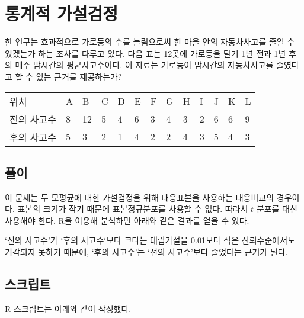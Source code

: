\section{통계적 가설검정}
한 연구는 효과적으로 가로등의 수를 늘림으로써 한 마을 안의 자동차사고를
줄일 수 있겠는가 하는 조사를 다루고 있다. 다음 표는 12곳에 가로등을 달기
1년 전과 1년 후의 매주 밤시간의 평균사고수이다. 이 자료는 가로등이 밤시간의
자동차사고를 줄였다고 할 수 있는 근거를 제공하는가?

\begin{tabularx}{0.9\textwidth}{ l|XXXXXXXXXXXX }
  \noalign{\smallskip}\hline\noalign{\smallskip}
  위치 & A & B & C & D & E & F & G & H & I & J & K & L \\
  전의 사고수 &
    8 & 12 & 5 & 4 & 6 & 3 & 4 & 3 & 2 & 6 & 6 & 9 \\
  후의 사고수 &
    5 &  3 & 2 & 1 & 4 & 2 & 2 & 4 & 3 & 5 & 4 & 3
\end{tabularx}

\subsection{풀이}

이 문제는 두 모평균에 대한 가설검정을 위해 대응표본을 사용하는 대응비교의 경우이다.
표본의 크기가 작기 때문에 표본정규분포를 사용할 수 없다. 따라서 $t$-분포를 대신 사용해야 한다.
R을 이용해 분석하면 아래와 같은 결과를 얻을 수 있다.


`전의 사고수'가 `후의 사고수`보다 크다는 대립가설을 0.01보다 작은 신뢰수준에서도 기각되지 못하기 때문에,
`후의 사고수'는 `전의 사고수'보다 줄었다는 근거가 된다.

\subsection{스크립트}
R 스크립트는 아래와 같이 작성했다.


